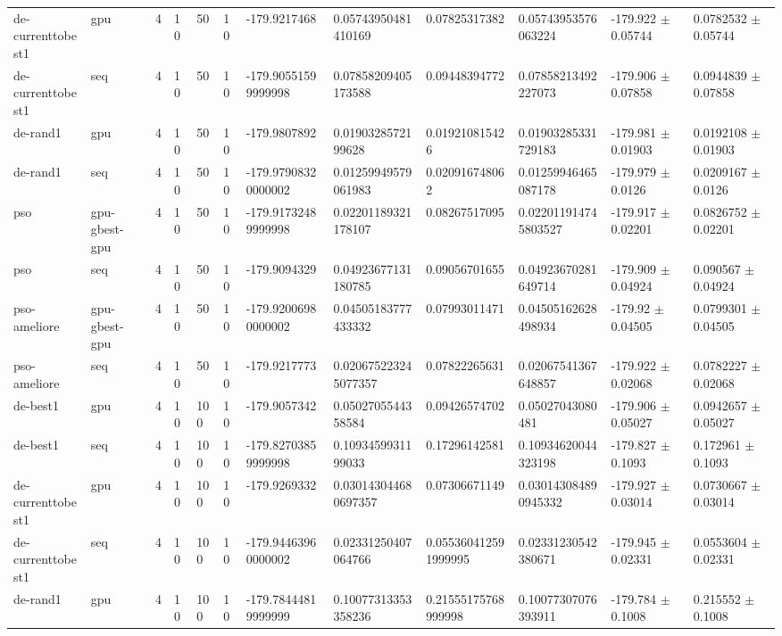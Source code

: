 \begin{table}[t]
\begin{tabular}{llllllllllll}
de-currenttobest1 & gpu & 4 & 10 & 50 & 10 & -179.9217468 & 0.05743950481410169 & 0.07825317382 & 0.05743953576063224 & -179.922 $\pm$ 0.05744 & 0.0782532 $\pm$ 0.05744 \\
de-currenttobest1 & seq & 4 & 10 & 50 & 10 & -179.90551599999998 & 0.07858209405173588 & 0.09448394772 & 0.07858213492227073 & -179.906 $\pm$ 0.07858 & 0.0944839 $\pm$ 0.07858 \\
de-rand1 & gpu & 4 & 10 & 50 & 10 & -179.9807892 & 0.0190328572199628 & 0.019210815426 & 0.01903285331729183 & -179.981 $\pm$ 0.01903 & 0.0192108 $\pm$ 0.01903 \\
de-rand1 & seq & 4 & 10 & 50 & 10 & -179.97908320000002 & 0.01259949579061983 & 0.020916748062 & 0.01259946465087178 & -179.979 $\pm$ 0.0126 & 0.0209167 $\pm$ 0.0126 \\
pso & gpu-gbest-gpu & 4 & 10 & 50 & 10 & -179.91732489999998 & 0.02201189321178107 & 0.08267517095 & 0.022011914745803527 & -179.917 $\pm$ 0.02201 & 0.0826752 $\pm$ 0.02201 \\
pso & seq & 4 & 10 & 50 & 10 & -179.9094329 & 0.04923677131180785 & 0.09056701655 & 0.04923670281649714 & -179.909 $\pm$ 0.04924 & 0.090567 $\pm$ 0.04924 \\
pso-ameliore & gpu-gbest-gpu & 4 & 10 & 50 & 10 & -179.92006980000002 & 0.04505183777433332 & 0.07993011471 & 0.04505162628498934 & -179.92 $\pm$ 0.04505 & 0.0799301 $\pm$ 0.04505 \\
pso-ameliore & seq & 4 & 10 & 50 & 10 & -179.9217773 & 0.020675223245077357 & 0.07822265631 & 0.02067541367648857 & -179.922 $\pm$ 0.02068 & 0.0782227 $\pm$ 0.02068 \\
de-best1 & gpu & 4 & 10 & 100 & 10 & -179.9057342 & 0.0502705544358584 & 0.09426574702 & 0.05027043080481 & -179.906 $\pm$ 0.05027 & 0.0942657 $\pm$ 0.05027 \\
de-best1 & seq & 4 & 10 & 100 & 10 & -179.82703859999998 & 0.1093459931199033 & 0.17296142581 & 0.10934620044323198 & -179.827 $\pm$ 0.1093 & 0.172961 $\pm$ 0.1093 \\
de-currenttobest1 & gpu & 4 & 10 & 100 & 10 & -179.9269332 & 0.030143044680697357 & 0.07306671149 & 0.030143084890945332 & -179.927 $\pm$ 0.03014 & 0.0730667 $\pm$ 0.03014 \\
de-currenttobest1 & seq & 4 & 10 & 100 & 10 & -179.94463960000002 & 0.02331250407064766 & 0.055360412591999995 & 0.02331230542380671 & -179.945 $\pm$ 0.02331 & 0.0553604 $\pm$ 0.02331 \\
de-rand1 & gpu & 4 & 10 & 100 & 10 & -179.78444819999999 & 0.10077313353358236 & 0.21555175768999998 & 0.10077307076393911 & -179.784 $\pm$ 0.1008 & 0.215552 $\pm$ 0.1008 \\

\end{tabular}
\end{table}
